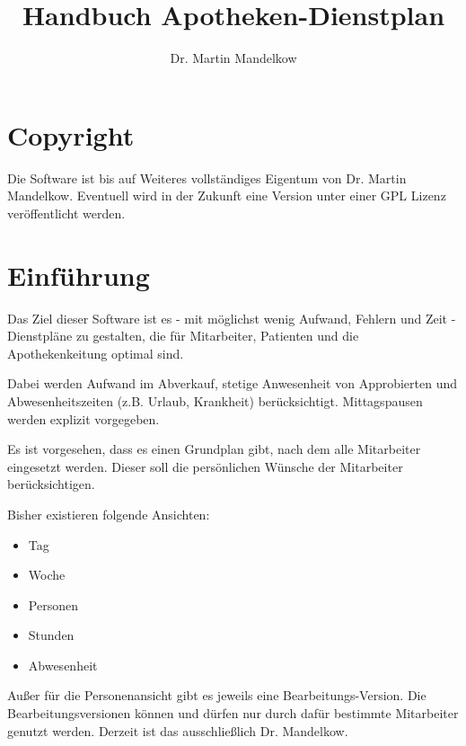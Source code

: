 \documentclass[10pt,a4paper,titlepage,oneside]{article}
\author{Dr. Martin Mandelkow}
\title{Handbuch Apotheken-Dienstplan}
\begin{document}
\maketitle
\tableofcontents\pagebreak 










\section{Copyright}
Die Software ist bis auf Weiteres vollständiges Eigentum von Dr. Martin Mandelkow.
Eventuell wird in der Zukunft eine Version unter einer GPL Lizenz veröffentlicht werden.










\section{Einführung}
Das Ziel dieser Software ist es - mit möglichst wenig Aufwand, Fehlern und Zeit - Dienstpläne zu gestalten, die für Mitarbeiter, Patienten und die Apothekenkeitung optimal sind.

Dabei werden Aufwand im Abverkauf, stetige Anwesenheit von Approbierten und Abwesenheitszeiten (z.B. Urlaub, Krankheit) berücksichtigt. Mittagspausen werden explizit vorgegeben.

Es ist vorgesehen, dass es einen Grundplan gibt, nach dem alle Mitarbeiter eingesetzt werden. Dieser soll die persönlichen Wünsche der Mitarbeiter berücksichtigen.

Bisher existieren folgende Ansichten:
\begin{itemize}
	\item Tag
	\item Woche
	\item Personen
	\item Stunden
	\item Abwesenheit
\end{itemize}

Außer für die Personenansicht gibt es jeweils eine Bearbeitungs-Version.
Die Bearbeitungsversionen können und dürfen nur durch dafür bestimmte Mitarbeiter genutzt werden. Derzeit ist das ausschließlich Dr. Mandelkow.
\end{document}
